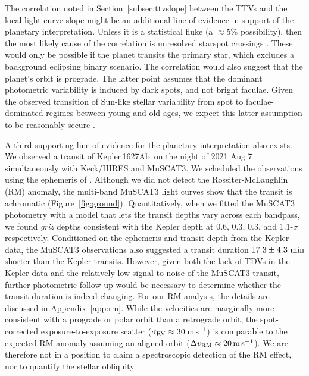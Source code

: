 \documentclass[12pt,modern,twocolumn,tighten,linenumbers,trackchanges]{aastex63}
\newcommand{\pn}{Kepler\,1627Ab} %
\newcommand{\ms}{\,m\,s$^{-1}$}
\begin{document}
The correlation noted in Section~\ref{subsec:ttvslope} between the
TTVs and the local light curve slope might be an additional line of evidence
in support of the planetary interpretation.  Unless it is a
statistical fluke (a $\approx$5\% possibility), then the most likely
cause of the correlation is unresolved starspot
crossings \citep{mazeh_time_2015}.  These would only be possible if the
planet transits the primary star, which excludes a background
eclipsing binary scenario.  The correlation would also suggest that the planet's
orbit is prograde.  The latter point assumes that the dominant
photometric variability is induced by dark spots, and not bright
faculae.  Given the observed transition of Sun-like stellar
variability from spot to faculae-dominated regimes between young and
old ages, we expect this latter assumption to be reasonably secure
\citep{shapiro_are_2016,montet_long-term_2017,reinhold_stellar_2020}.

A third supporting line of evidence for the planetary interpretation
also exists.  We observed a transit of \pn\ on the
night of 2021 Aug 7 simultaneously with Keck/HIRES and MuSCAT3.  We
scheduled the observations using the ephemeris of
\citet{holczer_transit_2016}.  Although we did not detect the
Rossiter-McLaughlin (RM) anomaly, the multi-band MuSCAT3 light curves
show that the transit is achromatic (Figure~\ref{fig:ground}).
Quantitatively, when we fitted the MuSCAT3
photometry with a model that lets the transit depths vary across each
bandpass, we found {\it griz} depths consistent with the Kepler depth
at 0.6, 0.3, 0.3, and 1.1-$\sigma$ respectively.  Conditioned on the
ephemeris and transit depth from the Kepler data, the MuSCAT3 observations also
suggested a transit duration $17.3\pm4.3\ {\rm min}$ shorter than the
Kepler transits.
However, given both the lack of TDVs in the Kepler data
and the relatively low signal-to-noise of the MuSCAT3 transit,
further photometric follow-up would be necessary to determine
whether the transit duration is indeed changing.  
For our RM analysis,
the details are discussed in Appendix~\ref{app:rm}.  While the
velocities are marginally more consistent with a prograde or polar
orbit than a retrograde orbit, the spot-corrected exposure-to-exposure
scatter ($\sigma_{\rm RV}\approx 30$\ms) is comparable to the expected
RM anomaly assuming an aligned orbit ($\Delta v_{\rm RM}\approx
20\,{\rm m\,s}^{-1}$).  We are therefore not in a position to claim a
spectroscopic detection of the RM effect, nor to quantify the stellar
obliquity.
\end{document}
